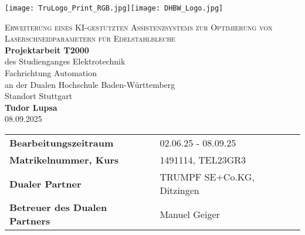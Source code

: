     \begin{titlepage}
        \centering %
       
        \texttt{[image: TruLogo\_Print\_RGB.jpg]}\hfill\texttt{[image: DHBW\_Logo.jpg]}
       
        \vspace{1.5cm} %
       
        {\LARGE\textsc{Erweiterung eines KI-gestützten Assistenzsystems zur Optimierung von
Laserschneidparametern für Edelstahlbleche}}\\[1.5cm]
       
        {\Large\textbf{Projektarbeit T2000}}\\[1cm]
       
        {\large
            des Studienganges Elektrotechnik\\
            Fachrichtung Automation\\
            an der Dualen Hochschule Baden-Württemberg\\
            Standort Stuttgart
        }\\[1.5cm]
       
        {\large\textbf{Tudor Lupsa}}\\[0.5cm]
       
        {\large 08.09.2025}\\[2cm]
       
        \begin{tabular}{ll}
            \textbf{Bearbeitungszeitraum} & 02.06.25 - 08.09.25\\
            \textbf{Matrikelnummer, Kurs} & 1491114, TEL23GR3\\
            \textbf{Dualer Partner} & TRUMPF SE+Co.KG, Ditzingen\\
            \textbf{Betreuer des Dualen Partners} & Manuel Geiger\\
        \end{tabular}
       
    \end{titlepage}